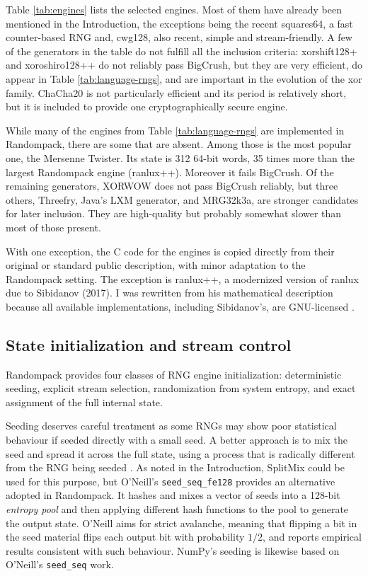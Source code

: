 \documentclass[manuscript,screen,review]{acmart}
\begin{document}
%
Table \ref{tab:engines} lists the selected engines. Most of them have
already been mentioned in the Introduction, the exceptions being the
recent squares64, a fast counter-based RNG and, cwg128, also recent,
simple and stream-friendly. A few of the generators in the table do
not fulfill all the inclusion criteria: xorshift128+ and
xoroshiro128++ do not reliably pass BigCrush, but they are very
efficient, do appear in Table \ref{tab:language-rngs}, and are
important in the evolution of the xor family. ChaCha20 is not
particularly efficient and its period is relatively short, but it is
included to provide one cryptographically secure engine.

While many of the engines from Table \ref{tab:language-rngs} are
implemented in Randompack, there are some that are absent. Among those
is the most popular one, the Mersenne Twister. Its state is 312 64-bit
words, 35 times more than the largest Randompack engine (ranlux++).
Moreover it fails BigCrush. Of the remaining generators, XORWOW does not
pass BigCrush reliably, but three others, Threefry, Java's LXM
generator, and MRG32k3a, are stronger candidates for later inclusion.
They are high-quality but probably somewhat slower than most of those
present.

With one exception, the C code for the engines is copied directly from
their original or standard public description, with minor adaptation
to the Randompack setting. The exception is ranlux++, a modernized
version of ranlux due to Sibidanov (2017). I was rewritten from his
mathematical description because all available implementations,
including Sibidanov's, are GNU-licensed
\cite{sibidanov2017ranluxpp,hahnfeld2021ranluxpp,jirka2021portable}.

\subsection{State initialization and stream control}
\label{sec:state-init}
Randompack provides four classes of RNG engine initialization:
deterministic seeding, explicit stream selection, randomization from
system entropy, and exact assignment of the full internal state.

Seeding deserves careful treatment as some RNGs may show poor
statistical behaviour if seeded directly with a small seed. A better
approach is to mix the seed and spread it across the full state, using
a process that is radically different from the RNG being seeded
\cite{matsumoto2007initialization,oneill2014pcg,blackman2021scrambled}.
As noted in the Introduction, SplitMix \cite{steele2014splitmix} could
be used for this purpose, but O'Neill's \texttt{seed\_seq\_fe128}
\cite{oneill2015seedseq} provides an alternative adopted in
Randompack. It hashes and mixes a vector of seeds into a 128-bit
\emph{entropy pool} and then applying different hash functions to the
pool to generate the output state. O'Neill aims for strict avalanche,
meaning that flipping a bit in the seed material flips each output bit
with probability $1/2$, and reports empirical results consistent with
such behaviour. NumPy's seeding is likewise based on O'Neill's
\texttt{seed\_seq} work.
\end{document}
